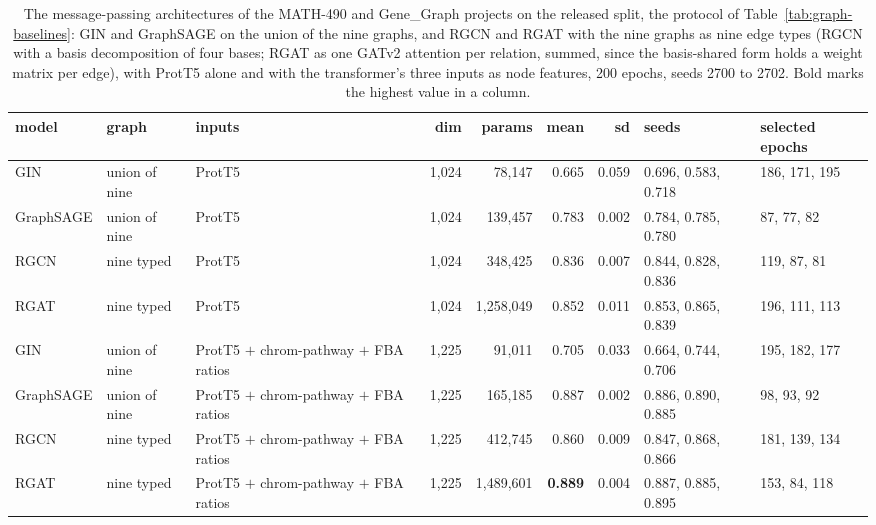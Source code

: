 \begin{table}[H]
  \centering
  \footnotesize
  \setlength{\tabcolsep}{2.5pt}
  \caption[Message-passing architectures]{The message-passing architectures of the MATH-490 and Gene\_Graph projects on the released split, the protocol of Table~\ref{tab:graph-baselines}: GIN and GraphSAGE on the union of the nine graphs, and RGCN and RGAT with the nine graphs as nine edge types (RGCN with a basis decomposition of four bases; RGAT as one GATv2 attention per relation, summed, since the basis-shared form holds a weight matrix per edge), with ProtT5 alone and with the transformer's three inputs as node features, 200 epochs, seeds 2700 to 2702. Bold marks the highest value in a column.}
  \label{tab:graph-relational}
  \begin{tabular}{@{}lllrrrrll@{}}
    \hline
    model & graph & inputs & dim & params & mean & sd & seeds & selected epochs \\
    \hline
    GIN & union of nine & ProtT5 & 1,024 & 78,147 & 0.665 & 0.059 & 0.696, 0.583, 0.718 & 186, 171, 195 \\
    GraphSAGE & union of nine & ProtT5 & 1,024 & 139,457 & 0.783 & 0.002 & 0.784, 0.785, 0.780 & 87, 77, 82 \\
    RGCN & nine typed & ProtT5 & 1,024 & 348,425 & 0.836 & 0.007 & 0.844, 0.828, 0.836 & 119, 87, 81 \\
    RGAT & nine typed & ProtT5 & 1,024 & 1,258,049 & 0.852 & 0.011 & 0.853, 0.865, 0.839 & 196, 111, 113 \\
    GIN & union of nine & ProtT5 $+$ chrom-pathway $+$ FBA ratios & 1,225 & 91,011 & 0.705 & 0.033 & 0.664, 0.744, 0.706 & 195, 182, 177 \\
    GraphSAGE & union of nine & ProtT5 $+$ chrom-pathway $+$ FBA ratios & 1,225 & 165,185 & 0.887 & 0.002 & 0.886, 0.890, 0.885 & 98, 93, 92 \\
    RGCN & nine typed & ProtT5 $+$ chrom-pathway $+$ FBA ratios & 1,225 & 412,745 & 0.860 & 0.009 & 0.847, 0.868, 0.866 & 181, 139, 134 \\
    RGAT & nine typed & ProtT5 $+$ chrom-pathway $+$ FBA ratios & 1,225 & 1,489,601 & \textbf{0.889} & 0.004 & 0.887, 0.885, 0.895 & 153, 84, 118 \\
    \hline
  \end{tabular}
\end{table}
